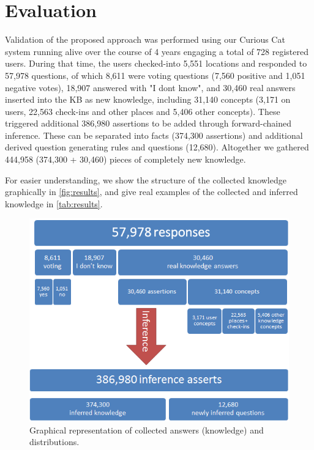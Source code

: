 % 
\chapter{Evaluation}
Validation of the proposed approach was performed using our Curious Cat system 
running alive over the course of 4 years engaging a total of 728 registered 
users. During that time, the users checked-into 5,551 locations and responded 
to 57,978 questions, of which 8,611 were voting questions (7,560 positive and 
1,051 negative votes), 18,907 answered with "I dont know", and 30,460 real 
answers inserted into the KB as new knowledge, including 31,140 concepts 
(3,171 on users, 22,563 check-ins and other places and 5,406 other concepts). 
These triggered additional 386,980 assertions to be added through 
forward-chained inference. These can be separated into facts (374,300 
assertions) and additional derived question generating rules and questions 
(12,680). Altogether we gathered 444,958 (374,300 + 30,460) pieces of 
completely new knowledge. 

For easier understanding, we show the structure of the collected knowledge 
graphically in \autoref{fig:results}, and give real examples of the collected 
and inferred knowledge in \autoref{tab:results}.

\begin{figure}[h]
	\centering
		\includegraphics[width=1\textwidth]{figures/results.png}
	\caption{Graphical representation of collected answers (knowledge) and 
    distributions.}
	\label{fig:results}
\end{figure}

